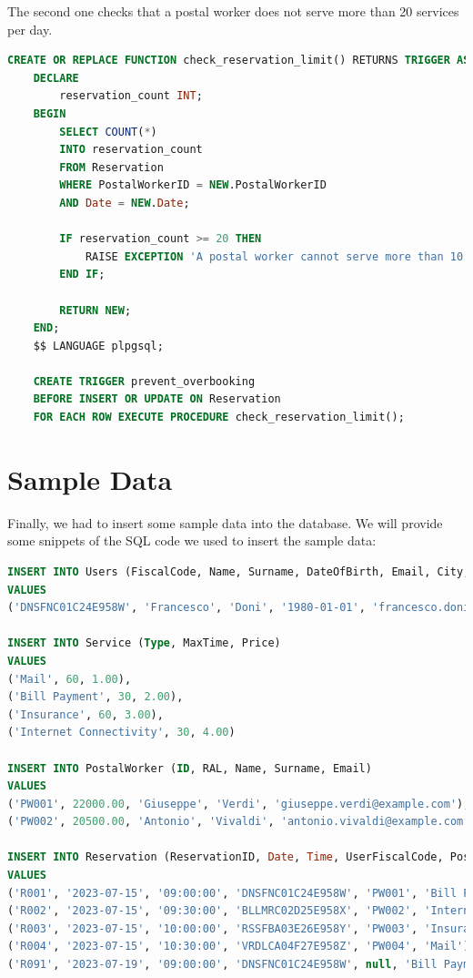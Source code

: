 \documentclass{article}
\begin{document}
The second one checks that a postal worker does not serve more than 20 services per day.
\begin{lstlisting}[language=SQL]
    CREATE OR REPLACE FUNCTION check_reservation_limit() RETURNS TRIGGER AS $$
    DECLARE
        reservation_count INT;
    BEGIN
        SELECT COUNT(*)
        INTO reservation_count
        FROM Reservation
        WHERE PostalWorkerID = NEW.PostalWorkerID
        AND Date = NEW.Date;
    
        IF reservation_count >= 20 THEN
            RAISE EXCEPTION 'A postal worker cannot serve more than 10 reservations per day';
        END IF;
    
        RETURN NEW;
    END;
    $$ LANGUAGE plpgsql;
    
    CREATE TRIGGER prevent_overbooking
    BEFORE INSERT OR UPDATE ON Reservation
    FOR EACH ROW EXECUTE PROCEDURE check_reservation_limit();
\end{lstlisting}

\section{Sample Data}
Finally, we had to insert some sample data into the database. We will provide some snippets of the SQL code we used to insert the sample data:
\begin{lstlisting}[language=SQL]
INSERT INTO Users (FiscalCode, Name, Surname, DateOfBirth, Email, City, ZIP, Address)
VALUES
('DNSFNC01C24E958W', 'Francesco', 'Doni', '1980-01-01', 'francesco.doni@example.com', 'Rome', '00147', 'Via Roma 10'),

INSERT INTO Service (Type, MaxTime, Price)
VALUES
('Mail', 60, 1.00),
('Bill Payment', 30, 2.00),
('Insurance', 60, 3.00),
('Internet Connectivity', 30, 4.00)

INSERT INTO PostalWorker (ID, RAL, Name, Surname, Email)
VALUES
('PW001', 22000.00, 'Giuseppe', 'Verdi', 'giuseppe.verdi@example.com'),
('PW002', 20500.00, 'Antonio', 'Vivaldi', 'antonio.vivaldi@example.com')

INSERT INTO Reservation (ReservationID, Date, Time, UserFiscalCode, PostalWorkerID, TypeOfService)
VALUES
('R001', '2023-07-15', '09:00:00', 'DNSFNC01C24E958W', 'PW001', 'Bill Payment'),
('R002', '2023-07-15', '09:30:00', 'BLLMRC02D25E958X', 'PW002', 'Internet Connectivity'),
('R003', '2023-07-15', '10:00:00', 'RSSFBA03E26E958Y', 'PW003', 'Insurance'),
('R004', '2023-07-15', '10:30:00', 'VRDLCA04F27E958Z', 'PW004', 'Mail'),
('R091', '2023-07-19', '09:00:00', 'DNSFNC01C24E958W', null, 'Bill Payment')
\end{lstlisting}
\end{document}
